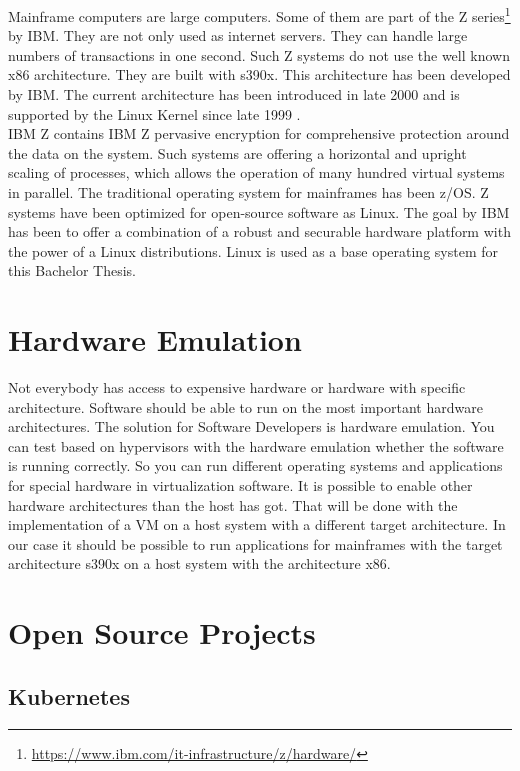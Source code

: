 Mainframe computers are large computers. Some of them are part of the Z series\footnote{\url{https://www.ibm.com/it-infrastructure/z/hardware/}} by IBM. They are not only used as internet servers. They can handle large numbers of transactions in one second\cite[~p.56]{Tanenbaum2014}. Such Z systems do not use the well known x86 architecture. They are built with s390x. This architecture has been developed by IBM. The current architecture has been introduced in late 2000 and is supported by the Linux Kernel since late 1999 \cite[~p.15]{Block2019}. \\
IBM Z contains IBM Z pervasive encryption for comprehensive protection around the data on the system\cite[~p.4]{Lascu2020}. Such systems are offering a horizontal and upright scaling of processes, which allows the operation of many hundred virtual systems in parallel\cite[~p.13]{Tschoeke2009}. The traditional operating system for mainframes has been z/OS. 
Z systems have been optimized for open-source software as Linux\cite[~p.8]{Lascu2020}. The goal by IBM has been to offer a combination of a robust and securable hardware platform with the power of a Linux distributions. 
Linux is used as a base operating system for this Bachelor Thesis.


\section{Hardware Emulation}

Not everybody has access to expensive hardware or hardware with  specific architecture. 
Software should be able to run on the most important hardware architectures. 
The solution for Software Developers is hardware emulation. 
You can test based on hypervisors with the hardware emulation whether the software is running correctly. 
So you can run different operating systems and applications for special hardware in virtualization software. 
It is possible to enable other hardware architectures than the host has got. 
That will be done with the implementation of a VM on a host system with a different target architecture\cite[~p.3]{Rosenthal2015}. 
In our case it should be possible to run applications for mainframes with the target architecture s390x on a host system with the architecture x86.

\section{Open Source Projects}

\subsection{Kubernetes}


